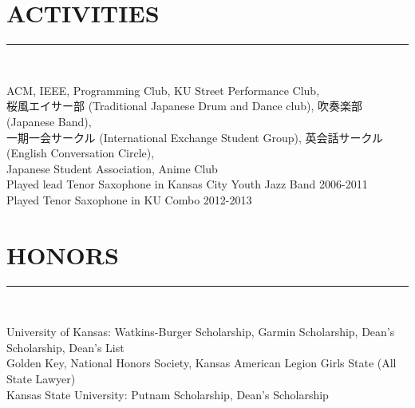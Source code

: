 \documentclass[twoside]{article}
\begin{document}
\section*{ACTIVITIES}
\vspace{-1em}
\rule{\textwidth}{1pt}\\
\begin{adjustwidth}{0.2in}{0in}
\vspace{-1em}
ACM, IEEE, Programming Club, KU Street Performance Club,\\
桜風エイサー部 (Traditional Japanese Drum and Dance club), 吹奏楽部 (Japanese Band),\\
一期一会サークル (International Exchange Student Group), 英会話サークル (English Conversation Circle),\\
Japanese Student Association, Anime Club\\
Played lead Tenor Saxophone in Kansas City Youth Jazz Band 2006-2011\\
Played Tenor Saxophone in KU Combo 2012-2013\\
\end{adjustwidth}

\section*{HONORS}
\vspace{-1em}
\rule{\textwidth}{1pt}\\
\begin{adjustwidth}{0.2in}{0in}
\vspace{-1em}
University of Kansas: Watkins-Burger Scholarship, Garmin Scholarship, Dean's Scholarship, Dean's List\\
Golden Key, National Honors Society, Kansas American Legion Girls State (All State Lawyer)\\
Kansas State University: Putnam Scholarship, Dean's Scholarship
\end{adjustwidth}
\end{document}
